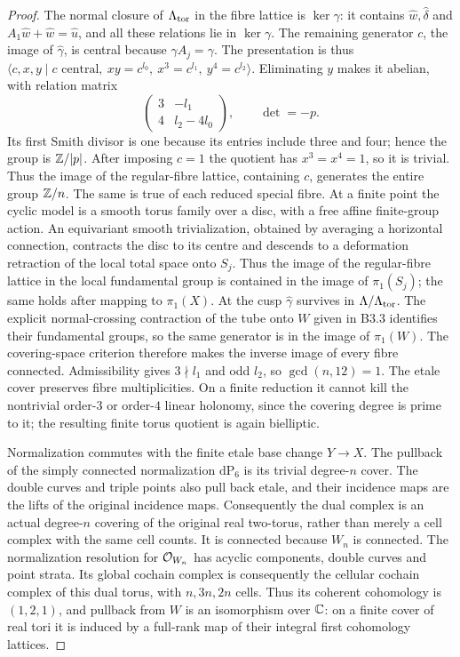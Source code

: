 \begin{proof}
The normal closure of $\Lambda_{\rm tor}$ in the fibre lattice is
$\ker\gamma$: it contains $\hat w,\hat\delta$ and
$A_1\hat w+\hat w=\hat u$, and all these relations lie in
$\ker\gamma$. The remaining generator $c$, the image of
$\hat\gamma$, is central because $\gamma A_j=\gamma$.
The presentation is thus
$\langle c,x,y\mid c\text{ central},\ xy=c^{l_0},\
x^3=c^{l_1},\ y^4=c^{l_2}\rangle$.
Eliminating $y$ makes it abelian, with relation matrix
\[
 \begin{pmatrix}3&-l_1\\4&l_2-4l_0\end{pmatrix},
 \qquad\det=-p.
\]
Its first Smith divisor is one because its entries include three
and four; hence the group is $\mathbb Z/|p|$.
After imposing $c=1$ the quotient has $x^3=x^4=1$, so it is trivial.
Thus the image of the regular-fibre lattice, containing $c$, generates
the entire group $\mathbb Z/n$. The same is true of each reduced special
fibre. At a finite point the cyclic model is a smooth torus family
over a disc, with a free affine finite-group action. An equivariant
smooth trivialization, obtained by averaging a horizontal connection,
contracts the disc to its centre and descends to a deformation
retraction of the local total space onto $S_j$. Thus the image of
the regular-fibre lattice in the local fundamental group is contained
in the image of $\pi_1(S_j)$; the same holds after mapping to
$\pi_1(X)$. At the cusp $\hat\gamma$ survives in
$\Lambda/\Lambda_{\rm tor}$. The explicit normal-crossing contraction
of the tube onto $W$ given in B3.3 identifies their fundamental groups,
so the same generator is in the image of $\pi_1(W)$.
The covering-space criterion therefore makes the inverse image of
every fibre connected. Admissibility gives $3\nmid l_1$ and odd $l_2$,
so $\gcd(n,12)=1$. The etale cover preserves fibre multiplicities.
On a finite reduction it cannot kill the nontrivial order-$3$ or
order-$4$ linear holonomy, since the covering degree is prime to it;
the resulting finite torus quotient is again bielliptic.

Normalization commutes with the finite etale base change $Y\to X$.
The pullback of the simply connected normalization $\mathrm{dP}_6$
is its trivial degree-$n$ cover. The double curves and triple points
also pull back etale, and their incidence maps are the lifts of the
original incidence maps. Consequently the dual complex is an actual
degree-$n$ covering of the original real two-torus, rather than merely
a cell complex with the same cell counts. It is connected because
$W_n$ is connected. The normalization resolution for $\mathcal O_{W_n}$
has acyclic components, double curves and point strata. Its global
cochain complex is consequently the cellular cochain complex of this
dual torus, with $n,3n,2n$ cells. Thus its coherent cohomology is
$(1,2,1)$, and pullback from $W$ is an isomorphism over $\mathbb C$:
on a finite cover of real tori it is induced by a full-rank map of
their integral first cohomology lattices.


\end{proof}

